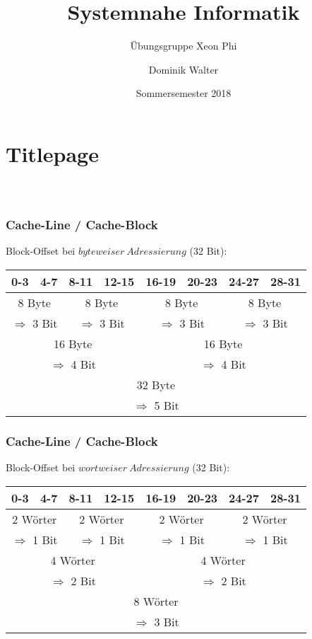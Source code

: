 \documentclass[xcolor=pdftex,dvipsnames,table]{beamer}
\title{Systemnahe Informatik}
\subtitle{Übungsgruppe Xeon Phi}
\author{Dominik Walter}
\date{Sommersemester 2018}
\begin{document}
\section*{Titlepage}
\begin{frame}
  \frametitle{\ }
  \titlepage
\end{frame}


\begin{frame}
	\frametitle{Cache-Line / Cache-Block}
	 Block-Offset bei $byteweiser\ Adressierung$ (32 Bit):
	\begin{tabular}{|c|c|c|c|c|c|c|c|}
		\hline
		0-3 & 4-7 & 8-11 & 12-15 & 16-19 & 20-23 & 24-27 & 28-31 \\
		\hline
		\hline
		\multicolumn{2}{|c|}{8 Byte} &
		\multicolumn{2}{c|}{8 Byte} &
		\multicolumn{2}{c|}{8 Byte} &
		\multicolumn{2}{c|}{8 Byte} \\
		\multicolumn{2}{|c|}{$\Rightarrow$ 3 Bit} &
		\multicolumn{2}{c|}{$\Rightarrow$ 3 Bit} &
		\multicolumn{2}{c|}{$\Rightarrow$ 3 Bit} &
		\multicolumn{2}{c|}{$\Rightarrow$ 3 Bit} \\
		\hline
		\multicolumn{4}{|c|}{16 Byte} &				\multicolumn{4}{c|}{16 Byte} \\
		\multicolumn{4}{|c|}{$\Rightarrow$ 4 Bit} &				\multicolumn{4}{c|}{$\Rightarrow$ 4 Bit} \\
		\hline
		\multicolumn{8}{|c|}{32 Byte} \\
		\multicolumn{8}{|c|}{$\Rightarrow$ 5 Bit} \\
		\hline
	\end{tabular}
\end{frame}

\begin{frame}
	\frametitle{Cache-Line / Cache-Block}
	Block-Offset bei $wortweiser\ Adressierung$ (32 Bit):
	\begin{tabular}{|c|c|c|c|c|c|c|c|}
		\hline
		0-3 & 4-7 & 8-11 & 12-15 & 16-19 & 20-23 & 24-27 & 28-31 \\
		\hline
		\hline
		\multicolumn{2}{|c|}{2 Wörter} &
		\multicolumn{2}{c|}{2 Wörter} &
		\multicolumn{2}{c|}{2 Wörter} &
		\multicolumn{2}{c|}{2 Wörter} \\
		\multicolumn{2}{|c|}{$\Rightarrow$ 1 Bit} &
		\multicolumn{2}{c|}{$\Rightarrow$ 1 Bit} &
		\multicolumn{2}{c|}{$\Rightarrow$ 1 Bit} &
		\multicolumn{2}{c|}{$\Rightarrow$ 1 Bit} \\
		\hline
		\multicolumn{4}{|c|}{4 Wörter} &				\multicolumn{4}{c|}{4 Wörter} \\
		\multicolumn{4}{|c|}{$\Rightarrow$ 2 Bit} &				\multicolumn{4}{c|}{$\Rightarrow$ 2 Bit} \\
		\hline
		\multicolumn{8}{|c|}{8 Wörter} \\
		\multicolumn{8}{|c|}{$\Rightarrow$ 3 Bit} \\
		\hline
	\end{tabular}
\end{frame}
\end{document}
